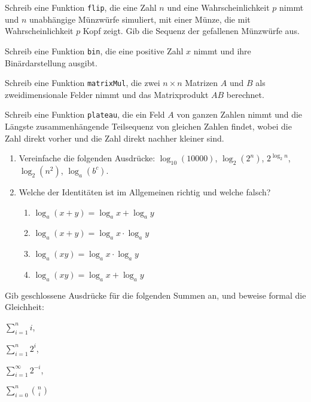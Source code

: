 \documentclass{uebung_cs}
\begin{document}
\begin{aufgabe}
    Schreib eine Funktion \texttt{flip}, die eine Zahl $n$ und eine Wahrscheinlichkeit $p$ nimmt und $n$ unabhängige Münzwürfe simuliert, mit einer Münze, die mit Wahrscheinlichkeit $p$ Kopf zeigt. Gib die Sequenz der gefallenen Münzwürfe aus.
\end{aufgabe}

\begin{aufgabe}[Binärzahlen]
    Schreib eine Funktion \texttt{bin}, die eine positive Zahl $x$ nimmt und ihre Binärdarstellung ausgibt.
\end{aufgabe}

\begin{aufgabe}[Matrixmultiplikation]
    Schreib eine Funktion \texttt{matrixMul}, die zwei $n\times n$ Matrizen $A$ und $B$ als zweidimensionale Felder nimmt und das Matrixprodukt $AB$ berechnet.
\end{aufgabe}

\begin{aufgabe}
    Schreib eine Funktion \texttt{plateau}, die ein Feld $A$ von ganzen Zahlen nimmt und die Längste zusammenhängende Teilsequenz von gleichen Zahlen findet, wobei die Zahl direkt vorher und die Zahl direkt nachher kleiner sind.
\end{aufgabe}

\begin{aufgabe}[Logarithmus]\mbox{}
    \begin{enumerate}
        \item Vereinfache die folgenden Ausdrücke:
        $\log_{10}(10000)$,\;
        $\log_2(2^n)$,\;
        $2^{\log_2 n}$,\;
        $\log_2(n^2)$,\;
        $\log_a(b^c)$.
        \item Welche der Identitäten ist im Allgemeinen richtig und welche falsch?
        \begin{enumerate}[1)]
            \item $\log_a(x+y)= \log_a x+ \log_a y$
            \item $\log_a(x+y)= \log_a x \cdot \log_a y$
            \item $\log_a(xy)= \log_a x\cdot \log_a y$
            \item $\log_a(xy)= \log_a x+ \log_a y$
        \end{enumerate}
    \end{enumerate}
\end{aufgabe}

\begin{aufgabe}[Summen]
    Gib geschlossene Ausdrücke für die folgenden Summen an, und beweise formal die Gleichheit:
    \begin{enumerate*}[(a)]
        \item $\sum_{i=1}^n i$,\;
        \item $\sum_{i=1}^n 2^{i}$,\;
        \item $\sum_{i=1}^\infty 2^{-i}$,\;
        \item $\sum_{i=0}^n \binom{n}{i}$
    \end{enumerate*}
\end{aufgabe}
\end{document}
